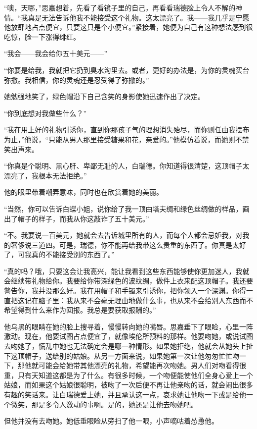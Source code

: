 \par “噢，天哪，”思嘉想着，先看了看镜子里的自己，再看看瑞德脸上令人不解的神情。“我真是无法告诉他我不能接受这个礼物。这太漂亮了。我——我几乎是宁愿他放肆地占点便宜，只要这只是个小便宜。”紧接着，她便为自己有这种想法感到很吃惊，脸一下涨得绯红。
\par “我会——我会给你五十美元——”
\par “你要是给我，我就把它扔到臭水沟里去。或者，更好的办法是，为你的灵魂买台弥撒。我相信，你的灵魂还是忍受得了弥撒的。”
\par 她勉强地笑了，绿色帽沿下自己含笑的身影使她迅速作出了决定。
\par “你到底想对我做些什么？”
\par “我在用上好的礼物引诱你，直到你那孩子气的理想消失殆尽，而你则任由我摆布为止，”他说，“只能从男人那里接受糖果和花，亲爱的。”他模仿着说，而她则不禁笑出声来。
\par “你真是个聪明、黑心肝、卑鄙无耻的人，白瑞德。你知道得很清楚，这顶帽子太漂亮了，我根本无法拒绝。”
\par 他的眼里带着嘲弄意味，同时也在欣赏着她的美丽。
\par “当然，你可以告诉白蝶小姐，说你给了我一顶由塔夫绸和绿色丝绸做的样品，画出了帽子的样子，而我从你这敲诈了五十美元。”
\par “不。我要说一百美元，她就会去告诉城里所有的人，而每个人都会忌妒我，对我的奢侈说三道四。可是，瑞德，你不能再给我带这么贵重的东西了。你真是太好了，可我真的不能接受别的东西了。”
\par “真的吗？哦，只要这会让我高兴，能让我看到这些东西能够使你更加迷人，我就会继续带礼物给你。我要给你带深绿色的波纹绸，做件上衣来配这顶帽子。我还要警告你，我并没那么好。我在用帽子和手镯来引诱你，把你领入一个深渊。你得一直把这记在脑子里：我从来不会毫无理由地做什么事，也从来不会给别人东西而不希望得到什么来作为回报。我总是要获取报酬的。”
\par 他乌黑的眼睛在她的脸上搜寻着，慢慢转向她的嘴唇。思嘉垂下了眼睑，心里一阵激动。现在，他要试图占点便宜了，就像埃伦所预料的那样。他要吻她，或说试图去吻她了，慌乱中她也无法确定会是哪一种情形。如果她拒绝，他就会从她头上扯下这顶帽子，送给别的姑娘。从另一方面来说，如果她第一次让他匆匆忙忙吻一下，那他就可能会给她带其他漂亮的礼物，希望能再次吻她。男人们对吻看得很重，只有天知道这都是为了什么。有很多时候，一个吻便能使他们全身心爱上一个姑娘，而如果这个姑娘很聪明，被吻了一次后便不再让他亲吻的话，就会闹出很多有趣的笑话来。让白瑞德爱上她，并且承认这一点，哀求她让他吻一下或是给他一个微笑，那是多令人激动的事啊。是的，她还是让他去吻她吧。
\par 但他并没有去吻她。她低垂眼睑从旁扫了他一眼，小声嘀咕着怂恿他。
